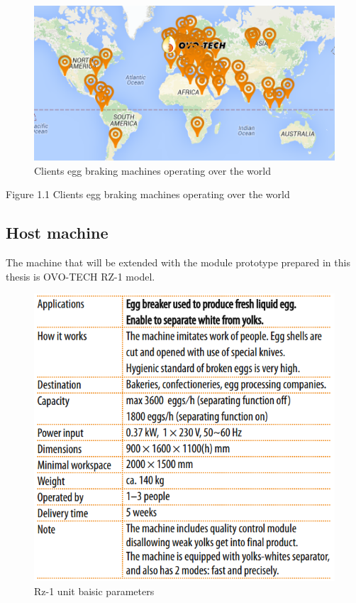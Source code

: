\documentclass[12pt,twoside,a4paper]{article}
\begin{document}
\begin{figure}[H]
\centering
\includegraphics[width=0.4\paperwidth]{map}
\caption{Clients egg braking machines operating over the world}
\end{figure}

Figure 1.1 Clients egg braking machines operating over the world


\subsection{Host machine}
The machine that will be extended with the module prototype prepared in this thesis is OVO-TECH RZ-1 model.

\begin{figure}[H]
\centering
\includegraphics[width=0.4\paperwidth]{rz1table}
\caption{Rz-1 unit baisic parameters}
\end{figure}
\end{document}
